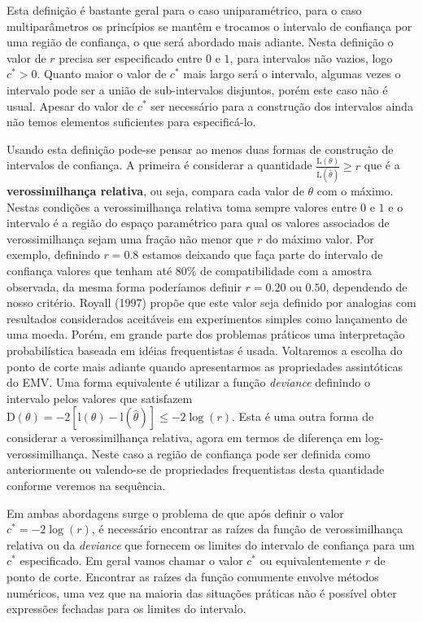 \documentclass[
  9pt,
  a5paper,
]{book}
\theoremstyle{definition}
\theoremstyle{definition}
\theoremstyle{definition}
\theoremstyle{definition}
\theoremstyle{remark}
\begin{document}
Esta definição é bastante geral para o caso uniparamétrico, para o caso multiparâmetros
os princípios se mantêm e trocamos o intervalo de confiança por uma região de confiança, o que será abordado mais adiante. Nesta definição o valor de \(r\) precisa ser especificado entre \(0\) e \(1\), para intervalos não vazios, logo \(c^* > 0\). Quanto maior o valor de \(c^*\) mais largo será o intervalo, algumas vezes o intervalo pode ser a união de sub-intervalos disjuntos, porém este caso não é usual. Apesar do valor de \(c^*\) ser necessário para a construção dos intervalos ainda não temos elementos suficientes para especificá-lo.

Usando esta definição pode-se pensar ao menos duas formas de construção de intervalos de confiança. A primeira é considerar a quantidade \(\frac{\mathrm{L}(\theta)}{\mathrm{L}(\hat{\theta})} \ge r\) que é a \textbf{verossimilhança relativa}, ou seja, compara cada valor de \(\theta\) com o máximo. Nestas condições a verossimilhança relativa toma sempre valores entre \(0\) e \(1\) e o intervalo é a região do espaço paramétrico para qual os valores associados de verossimilhança sejam uma fração não menor que \(r\) do máximo valor. Por exemplo, definindo \(r = 0.8\) estamos deixando que faça parte do intervalo de confiança valores que tenham até \(80\%\) de compatibilidade com a amostra observada, da mesma forma poderíamos definir \(r = 0.20\) ou \(0.50\), dependendo de nosso critério. Royall (1997) propõe que este valor seja definido por analogias com resultados considerados aceitáveis em experimentos simples como lançamento de uma moeda.
Porém, em grande parte dos problemas práticos uma interpretação probabilística baseada em idéias frequentistas é usada. Voltaremos a escolha do ponto de corte mais adiante quando apresentarmos as propriedades assintóticas do EMV.
Uma forma equivalente é utilizar a função \emph{deviance} definindo o intervalo
pelos valores que satisfazem \(\mathrm{D}(\theta) = -2[\mathrm{l}(\theta)-\mathrm{l}(\hat{\theta})] \leq -2 \log(r)\).
Esta é uma outra forma de considerar a verossimilhança relativa,
agora em termos de diferença em log-verossimilhança.
Neste caso a região de confiança pode ser definida como anteriormente ou valendo-se
de propriedades frequentistas desta quantidade conforme veremos na sequência.

Em ambas abordagens surge o problema de que após definir o valor \(c^* = -2\log(r)\), é necessário encontrar as raízes da função de verossimilhança relativa ou da \emph{deviance} que fornecem os limites do intervalo de confiança para um \(c^*\) especificado. Em geral vamos chamar o valor \(c^*\) ou equivalentemente \(r\) de ponto de corte.
Encontrar as raízes da função comumente envolve métodos numéricos, uma vez que na maioria das situações práticas não é possível obter expressões fechadas para os limites do intervalo.
\end{document}
